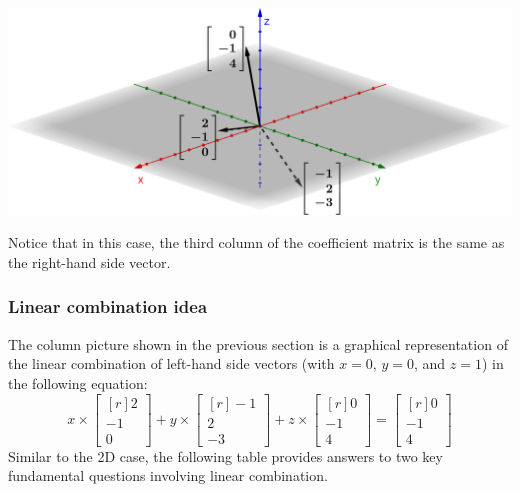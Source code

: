 \documentclass[../main.tex]{subfiles}
\begin{document}
\begingroup
\centering
\includegraphics[width = \columnwidth]{../figures/fig04_3d-col-pic/geogebra-derived}
\par
\endgroup
Notice that in this case, the third column of the coefficient matrix is the same as the right-hand side vector.

\subsubsection{Linear combination idea}
The column picture shown in the previous section is a graphical representation of the linear combination of left-hand side vectors (with $x = 0$, $y = 0$, and $z = 1$) in the following equation:
\[
    x \times
    \begin{bmatrix*}[r]
        2 \\
        -1 \\
        0
    \end{bmatrix*}
    +
    y \times
    \begin{bmatrix*}[r]
        -1 \\
        2 \\
        -3
    \end{bmatrix*}
    +
    z \times
    \begin{bmatrix*}[r]
        0 \\
        -1 \\
        4
    \end{bmatrix*}
    =
    \begin{bmatrix*}[r]
        0 \\
        -1 \\
        4
    \end{bmatrix*}
\]
Similar to the 2D case, the following table provides answers to two key fundamental questions involving linear combination.
\end{document}
